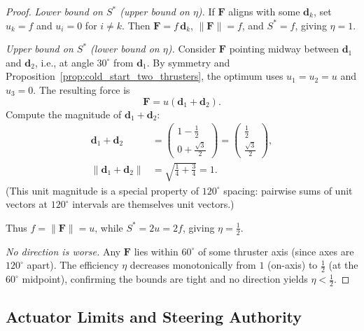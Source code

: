 \documentclass{article}
\begin{document}
\begin{proof}
\emph{Lower bound on $S^*$ (upper bound on $\eta$).}
If $\mathbf F$ aligns with some $\mathbf d_k$, set $u_k = f$ and $u_i = 0$ for $i \neq k$. 
Then $\mathbf F = f\,\mathbf d_k$, $\|\mathbf F\| = f$, and $S^* = f$, giving $\eta = 1$.

\emph{Upper bound on $S^*$ (lower bound on $\eta$).}
Consider $\mathbf F$ pointing midway between $\mathbf d_1$ and $\mathbf d_2$, i.e., at angle 
$30^\circ$ from $\mathbf d_1$. By symmetry and Proposition~\ref{prop:cold_start_two_thrusters}, 
the optimum uses $u_1 = u_2 = u$ and $u_3 = 0$. The resulting force is
\[
\mathbf F = u(\mathbf d_1 + \mathbf d_2).
\]
Compute the magnitude of $\mathbf d_1 + \mathbf d_2$:
\[
\begin{aligned}
\mathbf d_1 + \mathbf d_2 
&= \begin{pmatrix}1 - \tfrac{1}{2}\\[2pt] 0 + \tfrac{\sqrt{3}}{2}\end{pmatrix}
= \begin{pmatrix}\tfrac{1}{2}\\[2pt] \tfrac{\sqrt{3}}{2}\end{pmatrix}, \\[6pt]
\|\mathbf d_1 + \mathbf d_2\| 
&= \sqrt{\tfrac{1}{4} + \tfrac{3}{4}} = 1.
\end{aligned}
\]
(This unit magnitude is a special property of $120^\circ$ spacing: pairwise sums of unit 
vectors at $120^\circ$ intervals are themselves unit vectors.)

Thus $f = \|\mathbf F\| = u$, while $S^* = 2u = 2f$, giving $\eta = \tfrac{1}{2}$.

\emph{No direction is worse.}
Any $\mathbf F$ lies within $60^\circ$ of some thruster axis (since axes are $120^\circ$ apart). 
The efficiency $\eta$ decreases monotonically from $1$ (on-axis) to $\tfrac{1}{2}$ (at the 
$60^\circ$ midpoint), confirming the bounds are tight and no direction yields $\eta < \tfrac{1}{2}$.
\end{proof}


\subsection{Actuator Limits and Steering Authority}
\end{document}
